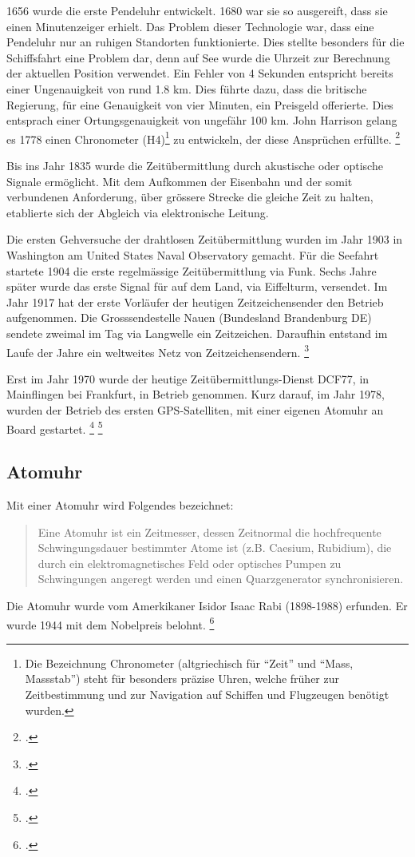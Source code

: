 1656 wurde die erste Pendeluhr entwickelt. 1680 war sie so ausgereift, dass sie einen Minutenzeiger erhielt. Das Problem dieser Technologie war, dass eine Pendeluhr nur an ruhigen Standorten funktionierte.
Dies stellte besonders für die Schiffsfahrt eine Problem dar, denn auf See wurde die Uhrzeit zur Berechnung der aktuellen Position verwendet.
Ein Fehler von 4 Sekunden entspricht bereits einer Ungenauigkeit  von rund 1.8 km.
Dies führte dazu, dass die britische Regierung, für eine Genauigkeit von vier Minuten, ein Preisgeld offerierte. Dies entsprach einer Ortungsgenauigkeit von ungefähr 100 km.
John Harrison gelang es 1778 einen Chronometer (H4)\footnote{Die Bezeichnung Chronometer (altgriechisch für "`Zeit"' und "`Mass, Massstab"') steht für besonders präzise Uhren, welche früher zur Zeitbestimmung und zur Navigation auf Schiffen und Flugzeugen benötigt wurden.} zu entwickeln, der diese Ansprüchen erfüllte. \footcite{wikiChronometer}

Bis ins Jahr 1835 wurde die Zeitübermittlung durch akustische oder optische Signale ermöglicht.
Mit dem Aufkommen der Eisenbahn und der somit verbundenen Anforderung, über grössere Strecke die gleiche Zeit zu halten, etablierte sich der Abgleich via elektronische Leitung.

Die ersten Gehversuche der drahtlosen Zeitübermittlung wurden im Jahr 1903 in Washington am United States Naval Observatory gemacht.
Für die Seefahrt startete 1904 die erste regelmässige Zeitübermittlung via Funk. Sechs Jahre später wurde das erste Signal für auf dem Land, via Eiffelturm, versendet. Im Jahr 1917 hat der erste Vorläufer der heutigen Zeitzeichensender den Betrieb aufgenommen. Die Grosssendestelle Nauen (Bundesland Brandenburg DE) sendete zweimal im Tag via Langwelle ein Zeitzeichen. Daraufhin entstand im Laufe der Jahre ein weltweites Netz von Zeitzeichensendern. \footcite{wikiFunkHistory}

Erst im Jahr 1970 wurde der heutige Zeitübermittlungs-Dienst DCF77, in Mainflingen bei Frankfurt, in Betrieb genommen.
Kurz darauf, im Jahr 1978, wurden der Betrieb des ersten GPS-Satelliten, mit einer eigenen Atomuhr an Board gestartet. \footcite{astrosiggiFunk}  \footcite{wikiTimeSignal}

\subsection{Atomuhr}
Mit einer Atomuhr wird Folgendes bezeichnet:
\begin{quote}
Eine Atomuhr ist ein Zeitmesser, dessen Zeitnormal die hochfrequente Schwingungsdauer bestimmter Atome ist (z.B. Caesium, Rubidium), die durch ein elektromagnetisches Feld oder optisches Pumpen zu Schwingungen angeregt werden und einen Quarzgenerator synchronisieren.
\end{quote}
Die Atomuhr wurde vom Amerkikaner Isidor Isaac Rabi (1898-1988) erfunden. Er wurde 1944 mit dem Nobelpreis belohnt. \footcite{meinbergAtomClock}

